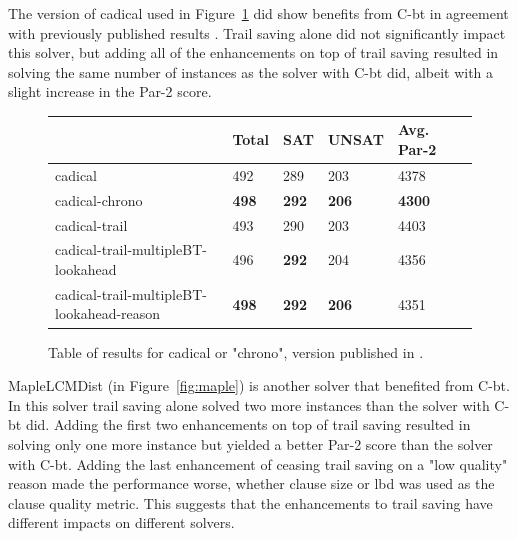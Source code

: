 \documentclass[runningheads]{llncs}
\newcommand{\cbt}{C-bt\xspace}
\begin{document}
The version of cadical used in Figure~\ref{fig:cadicalOld} did show
benefits from \cbt in agreement with previously published results
\cite{DBLP:conf/sat/MohleB19}. Trail saving alone did not
significantly impact this solver, but adding all of the enhancements
on top of trail saving resulted in solving the same number of
instances as the solver with \cbt did, albeit with a slight increase
in the Par-2 score.

\begin{figure}
\centering
    \begin{tabular}{|l|l|l|l|l|l|}
      \hline
      & Total & SAT & UNSAT & Avg. Par-2 \\ \hline
      cadical                  & 492          & 289 &  203  & 4378                            \\ \hline
      cadical-chrono   & \textbf{498}  & \textbf{292} &  \textbf{206}  & \textbf{4300}      \\ \hline
      cadical-trail           & 493          & 290 &  203  & 4403                            \\ \hline
      cadical-trail-multipleBT-lookahead & 496  & \textbf{292} &  204  & 4356                    \\ \hline
      cadical-trail-multipleBT-lookahead-reason & \textbf{498} & \textbf{292} & \textbf{206} & 4351 \\ \hline
    \end{tabular}
    \caption{Table of results for cadical or "chrono", version published in \cite{DBLP:conf/sat/MohleB19}.}
    \label{fig:cadicalOld}
\end{figure}

MapleLCMDist (in Figure~\ref{fig:maple}) is another solver that
benefited from \cbt. In this solver trail saving alone solved two more
instances than the solver with \cbt did. Adding the first two
enhancements on top of trail saving resulted in solving only one more
instance but yielded a better Par-2 score than the solver with
\cbt. Adding the last enhancement of ceasing trail saving on a "low
quality" reason made the performance worse, whether clause size or lbd
was used as the clause quality metric. This suggests that the
enhancements to trail saving have different impacts on different
solvers.
\end{document}
